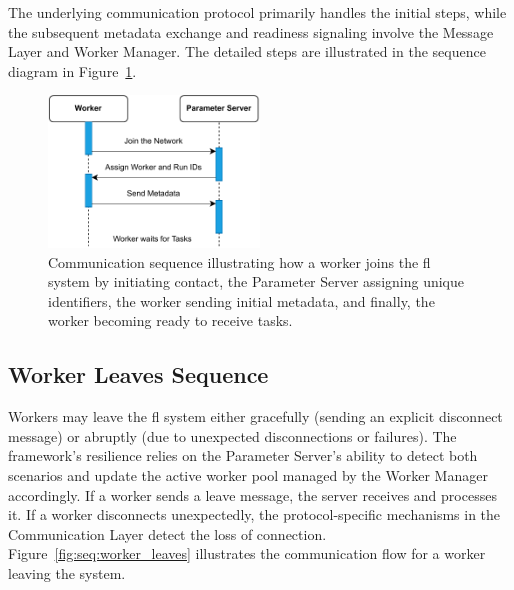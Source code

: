 The underlying communication protocol primarily handles the initial steps, while the subsequent metadata exchange and readiness signaling involve the Message Layer and Worker Manager. The detailed steps are illustrated in the sequence diagram in Figure~\ref{fig:seq:worker_joins}.

\begin{figure}[!htb]
    \centering
    \includegraphics[width=0.5\textwidth]{figs/worker_joins.pdf}
    \caption[Worker Join Sequence in Federated Learning]{Communication sequence illustrating how a worker joins the \ac{fl} system by initiating contact, the Parameter Server assigning unique identifiers, the worker sending initial metadata, and finally, the worker becoming ready to receive tasks.}
    \label{fig:seq:worker_joins}
\end{figure}

\subsection{Worker Leaves Sequence}

Workers may leave the \ac{fl} system either gracefully (sending an explicit disconnect message) or abruptly (due to unexpected disconnections or failures). The framework's resilience relies on the Parameter Server's ability to detect both scenarios and update the active worker pool managed by the Worker Manager accordingly. If a worker sends a leave message, the server receives and processes it. If a worker disconnects unexpectedly, the protocol-specific mechanisms in the Communication Layer detect the loss of connection. Figure~\ref{fig:seq:worker_leaves} illustrates the communication flow for a worker leaving the system.


